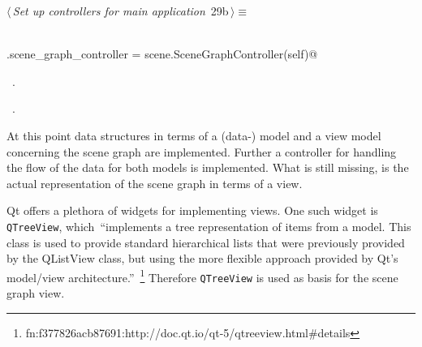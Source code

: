 \documentclass[
    a4paper,      %
    10pt,         %
    openright,    %
    notitlepage,  %
    parskip=half, %
]{scrreprt}       %
\theoremstyle{definition}                    %
\begin{document}
\begin{flushleft} \small
\begin{minipage}{\linewidth}\label{scrap30}\raggedright\small
{} $\langle\,${\itshape Set up controllers for main application}\nobreak\ {\footnotesize {29b}}$\,\rangle\equiv$
\vspace{-1exm}
\begin{list}{}{} \item
\mbox{}\lstinline@@\\
\mbox{}\lstinline@self.scene_graph_controller = scene.SceneGraphController(self)@{\NWsep}
\end{list}
\vspace{-1.5ex}
\footnotesize
\begin{list}{}{\setlength{\itemsep}{-\parsep}\setlength{\itemindent}{-\leftmargin}}
\item \NWtxtMacroDefBy\ .
\item \NWtxtMacroRefIn\ .

\item{}
\end{list}
\end{minipage}\vspace{4ex}
\end{flushleft}
At this point data structures in terms of a (data-) model and a view model
concerning the scene graph are implemented. Further a controller for handling
the flow of the data for both models is implemented. What is still missing, is
the actual representation of the scene graph in terms of a view.

Qt offers a plethora of widgets for implementing views. One such widget is
\verb+QTreeView+, which~\enquote{implements a tree representation of items from
a model. This class is used to provide standard hierarchical lists that were
previously provided by the QListView class, but using the more flexible approach
provided by Qt's model/view
architecture.}~\footnote{fn:f377826acb87691:http://doc.qt.io/qt-5/qtreeview.html\#details}
Therefore \verb+QTreeView+ is used as basis for the scene graph view.
\end{document}
